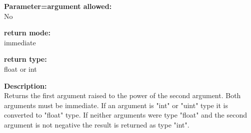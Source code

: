         {\bf Parameter=argument allowed:} \\
        No
        
        {\bf return mode:} \\
        immediate

        {\bf return type:} \\
        float or int
        
        {\bf Description:} \\
        Returns the first argument raised to the power of the second argument.
        Both arguments must be immediate. If an argument is "int" or "uint" type
        it is converted to "float" type. If neither arguments were type "float"
        and the second argument is not negative the result is returned as type
        "int".
 

%        
%        
%        
%        
%
%        
%        


